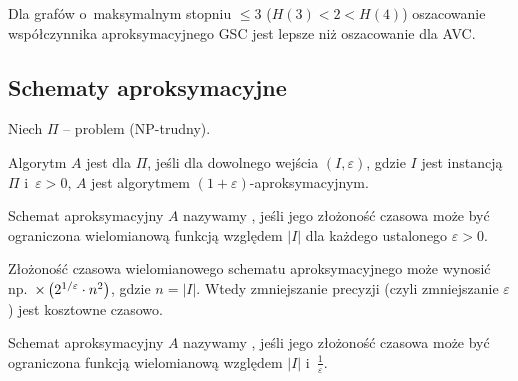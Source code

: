 Dla grafów o~maksymalnym stopniu $\leq 3$ ($H(3) < 2 < H(4)$) oszacowanie współczynnika aproksymacyjnego GSC jest lepsze niż oszacowanie dla AVC.

\subsection{Schematy aproksymacyjne}

Niech $\Pi$ -- problem (NP-trudny).

\begin{definition}
	Algorytm $A$ jest  dla $\Pi$, jeśli dla dowolnego wejścia $(I, \varepsilon)$, gdzie $I$ jest instancją $\Pi$ i~$\varepsilon > 0$, $A$ jest algorytmem $(1 + \varepsilon)$-aproksymacyjnym.
\end{definition}

\begin{definition}
	Schemat aproksymacyjny $A$ nazywamy , jeśli jego złożoność czasowa może być ograniczona wielomianową funkcją względem $|I|$ dla każdego ustalonego $\varepsilon > 0$.
\end{definition}

Złożoność czasowa wielomianowego schematu aproksymacyjnego może wynosić np.\ $\mathcal{\Theta}\left(2^{1/\varepsilon} \cdot n^2\right)$, gdzie $n = |I|$. Wtedy zmniejszanie precyzji (czyli zmniejszanie $\varepsilon$) jest kosztowne czasowo.

\begin{definition}
	Schemat aproksymacyjny $A$ nazywamy , jeśli jego złożoność czasowa może być ograniczona funkcją wielomianową względem $|I|$ i~$\frac{1}{\varepsilon}$.
\end{definition}
